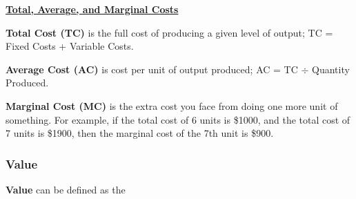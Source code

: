 \underline{\textbf{Total, Average, and Marginal Costs}}

\textbf{Total Cost (TC)} is the full cost of producing a given level of output; TC = Fixed Costs + Variable Costs.

\textbf{Average Cost (AC)} is cost per unit of output produced; AC = TC $\div$ Quantity Produced.

\textbf{Marginal Cost (MC)} is the extra cost you face from doing one more unit of something. For example, if the total cost of 6 units is \$1000, and the total cost of 7 units is \$1900, then the marginal cost of the 7th unit is \$900.


\subsubsection{Value}

\textbf{Value} can be defined as the 